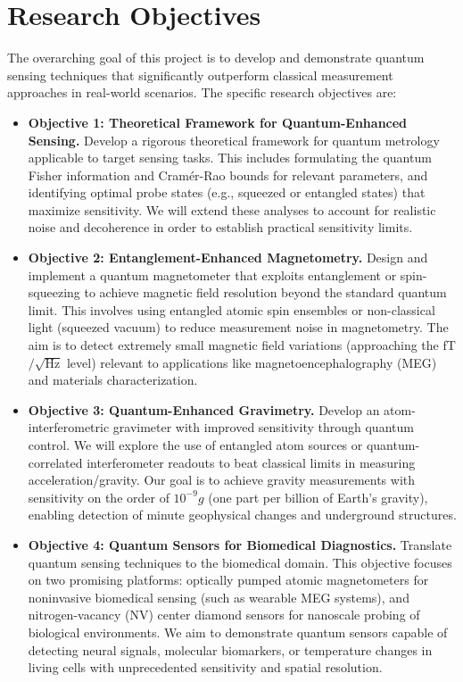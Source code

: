\documentclass[12pt]{article}
\begin{document}
\section{Research Objectives}

The overarching goal of this project is to develop and demonstrate
quantum sensing techniques that significantly outperform classical
measurement approaches in real-world scenarios. The specific research
objectives are:

\begin{itemize}
\item \textbf{Objective 1: Theoretical Framework for Quantum-Enhanced Sensing.} Develop a rigorous theoretical framework for quantum metrology applicable to target sensing tasks. This includes formulating the quantum Fisher information and Cramér-Rao bounds for relevant parameters, and identifying optimal probe states (e.g., squeezed or entangled states) that maximize sensitivity\cite{Braunstein1994}. We will extend these analyses to account for realistic noise and decoherence in order to establish practical sensitivity limits.
\item \textbf{Objective 2: Entanglement-Enhanced Magnetometry.} Design and implement a quantum magnetometer that exploits entanglement or spin-squeezing to achieve magnetic field resolution beyond the standard quantum limit. This involves using entangled atomic spin ensembles or non-classical light (squeezed vacuum) to reduce measurement noise in magnetometry\cite{Giovannetti2011}. The aim is to detect extremely small magnetic field variations (approaching the fT$/\sqrt{\text{Hz}}$ level) relevant to applications like magnetoencephalography (MEG) and materials characterization.
\item \textbf{Objective 3: Quantum-Enhanced Gravimetry.} Develop an atom-interferometric gravimeter with improved sensitivity through quantum control. We will explore the use of entangled atom sources or quantum-correlated interferometer readouts to beat classical limits in measuring acceleration/gravity. Our goal is to achieve gravity measurements with sensitivity on the order of $10^{-9}g$ (one part per billion of Earth’s gravity), enabling detection of minute geophysical changes and underground structures\cite{Menoret2018}.
\item \textbf{Objective 4: Quantum Sensors for Biomedical Diagnostics.} Translate quantum sensing techniques to the biomedical domain. This objective focuses on two promising platforms: optically pumped atomic magnetometers for noninvasive biomedical sensing (such as wearable MEG systems), and nitrogen-vacancy (NV) center diamond sensors for nanoscale probing of biological environments\cite{Aslam2023}. We aim to demonstrate quantum sensors capable of detecting neural signals, molecular biomarkers, or temperature changes in living cells with unprecedented sensitivity and spatial resolution.

\end{itemize}
\end{document}
